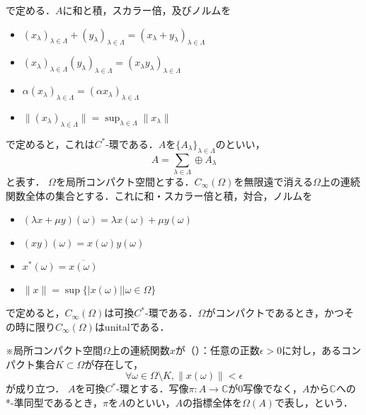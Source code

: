 で定める．$A$に和と積，スカラー倍，及びノルムを
\begin{itemize}
\item $\left( x_{\lambda}\right)_{\lambda \in \Lambda}+\left( y_{\lambda}\right)_{\lambda \in \Lambda}
=\left( x_{\lambda}+y_{\lambda}\right)_{\lambda \in \Lambda}$
\item $\left( x_{\lambda}\right)_{\lambda \in \Lambda}\left( y_{\lambda}\right)_{\lambda \in \Lambda}
=\left( x_{\lambda}y_{\lambda}\right)_{\lambda \in \Lambda}$
\item $\alpha \left( x_{\lambda}\right)_{\lambda \in \Lambda}=\left( \alpha x_{\lambda}\right)_{\lambda \in \Lambda}$
\item $\lVert \left( x_{\lambda}\right)_{\lambda \in \Lambda}\rVert=\sup_{\lambda \in \Lambda}\lVert x_{\lambda}\rVert$
\end{itemize}
で定めると，これは$C^*$-環である．$A$を$\{A_{\lambda}\}_{\lambda \in \Lambda}$のといい，
\[A=\sum_{\lambda \in \Lambda} \oplus A_{\lambda}\]
と表す．
$\Omega$を局所コンパクト空間とする．$C_{\infty}\left( \Omega\right)$を無限遠で消える$\Omega$上の連続関数全体の集合とする．これに和・スカラー倍と積，対合，ノルムを
\begin{itemize}
\item $\left(\lambda x+\mu y\right)\left(\omega\right)=\lambda x\left(\omega\right)+\mu y\left(\omega\right)$
\item $\left(xy\right)\left(\omega\right)=x\left(\omega\right)y\left(\omega\right)$
\item $x^*\left(\omega\right)=\overline{x\left(\omega\right)}$
\item $\lVert x\rVert=\sup\{|x\left(\omega\right)||\omega \in \Omega\}$
\end{itemize}
で定めると，$C_{\infty}(\Omega)$は可換$C^*$-環である．$\Omega$がコンパクトであるとき，かつその時に限り$C_{\infty}(\Omega)$はunitalである．

※局所コンパクト空間$\Omega$上の連続関数$x$が（）：任意の正数$\epsilon >0$に対し，あるコンパクト集合$K\subset \Omega$が存在して，
\[\forall \omega \in \Omega\setminus K,\lVert x(\omega)\rVert<\epsilon\]
が成り立つ．
$A$を可換$C^*$-環とする．写像$\pi:A\rightarrow\mathbb{C}$が0写像でなく，$A$から$\mathbb{C}$への *-準同型であるとき，$\pi$を$A$のといい，$A$の指標全体を$\Omega\left(A\right)$で表し，という．

